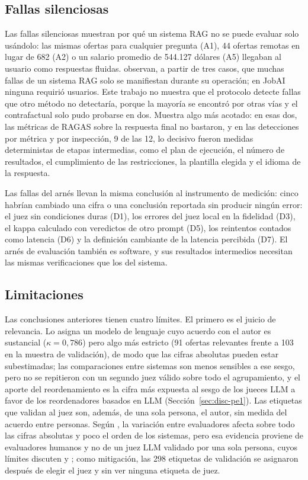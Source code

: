 \subsection{Fallas silenciosas}

Las fallas silenciosas muestran por qué un sistema RAG no se puede evaluar solo usándolo: las mismas ofertas para cualquier pregunta (A1), 44 ofertas remotas en lugar de 682 (A2) o un salario promedio de 544.127 dólares (A5) llegaban al usuario como respuestas fluidas. \citet{Barnett2024} observan, a partir de tres casos, que muchas fallas de un sistema RAG solo se manifiestan durante su operación; en JobAI ninguna requirió usuarios. Este trabajo no muestra que el protocolo detecte fallas que otro método no detectaría, porque la mayoría se encontró por otras vías y el contrafactual solo pudo probarse en dos. Muestra algo más acotado: en esas dos, las métricas de RAGAS sobre la respuesta final no bastaron, y en las detecciones por métrica y por inspección, 9 de las 12, lo decisivo fueron medidas deterministas de etapas intermedias, como el plan de ejecución, el número de resultados, el cumplimiento de las restricciones, la plantilla elegida y el idioma de la respuesta.

Las fallas del arnés llevan la misma conclusión al instrumento de medición: cinco habrían cambiado una cifra o una conclusión reportada sin producir ningún error: el juez sin condiciones duras (D1), los errores del juez local en la fidelidad (D3), el kappa calculado con veredictos de otro prompt (D5), los reintentos contados como latencia (D6) y la definición cambiante de la latencia percibida (D7). El arnés de evaluación también es software, y sus resultados intermedios necesitan las mismas verificaciones que los del sistema.

\subsection{Limitaciones}
\label{sec:res-limitaciones}

Las conclusiones anteriores tienen cuatro límites. El primero es el juicio de relevancia. Lo asigna un modelo de lenguaje cuyo acuerdo con el autor es sustancial ($\kappa = 0{,}786$) pero algo más estricto (91 ofertas relevantes frente a 103 en la muestra de validación), de modo que las cifras absolutas pueden estar subestimadas; las comparaciones entre sistemas son menos sensibles a ese sesgo, pero no se repitieron con un segundo juez válido sobre todo el agrupamiento, y el aporte del reordenamiento es la cifra más expuesta al sesgo de los jueces LLM a favor de los reordenadores basados en LLM (Sección~\ref{sec:disc-pe1}). Las etiquetas que validan al juez son, además, de una sola persona, el autor, sin medida del acuerdo entre personas. Según \citet{Voorhees2000}, la variación entre evaluadores afecta sobre todo las cifras absolutas y poco el orden de los sistemas, pero esa evidencia proviene de evaluadores humanos y no de un juez LLM validado por una sola persona, cuyos límites discuten \citet{Soboroff2025} y \citet{ClarkeDietz2024}; como mitigación, las 298 etiquetas de validación se asignaron después de elegir el juez y sin ver ninguna etiqueta de juez.

